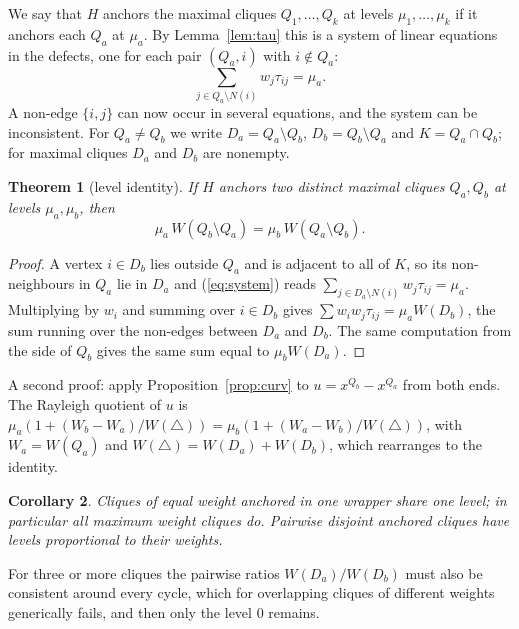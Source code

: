 \documentclass[11pt]{article}
\newtheorem{thm}{Theorem}[section]
\newtheorem{cor}[thm]{Corollary}
\theoremstyle{definition}
\theoremstyle{remark}
\begin{document}
We say that $H$ anchors the maximal cliques $Q_1,\ldots,Q_k$ at levels
$\mu_1,\ldots,\mu_k$ if it anchors each $Q_a$ at $\mu_a$. By
Lemma~\ref{lem:tau} this is a system of linear equations in the defects,
one for each pair $(Q_a,i)$ with $i\notin Q_a$:
\begin{equation}
\label{eq:system}
\sum_{j\in Q_a\setminus N(i)} w_j\tau_{ij}=\mu_a .
\end{equation}
A non-edge $\{i,j\}$ can now occur in several equations, and the system can
be inconsistent. For $Q_a\neq Q_b$ we write $D_a=Q_a\setminus Q_b$,
$D_b=Q_b\setminus Q_a$ and $K=Q_a\cap Q_b$; for maximal cliques $D_a$ and
$D_b$ are nonempty.

\begin{thm}[level identity]
\label{thm:level}
If $H$ anchors two distinct maximal cliques $Q_a,Q_b$ at levels
$\mu_a,\mu_b$, then
\[ \mu_a\,W(Q_b\setminus Q_a) = \mu_b\,W(Q_a\setminus Q_b). \]
\end{thm}
\begin{proof}
A vertex $i\in D_b$ lies outside $Q_a$ and is adjacent to all of $K$, so
its non-neighbours in $Q_a$ lie in $D_a$ and (\ref{eq:system}) reads
$\sum_{j\in D_a\setminus N(i)}w_j\tau_{ij}=\mu_a$. Multiplying by $w_i$ and
summing over $i\in D_b$ gives
$\sum w_iw_j\tau_{ij}=\mu_aW(D_b)$, the sum running over the non-edges
between $D_a$ and $D_b$. The same computation from the side of $Q_b$ gives
the same sum equal to $\mu_bW(D_a)$.
\end{proof}

A second proof: apply Proposition~\ref{prop:curv} to $u=x^{Q_b}-x^{Q_a}$
from both ends. The Rayleigh quotient of $u$ is
$\mu_a(1+(W_b-W_a)/W(\triangle))=\mu_b(1+(W_a-W_b)/W(\triangle))$, with
$W_a=W(Q_a)$ and $W(\triangle)=W(D_a)+W(D_b)$, which rearranges to the
identity.

\begin{cor}
\label{cor:equal}
Cliques of equal weight anchored in one wrapper share one level; in
particular all maximum weight cliques do. Pairwise disjoint anchored cliques
have levels proportional to their weights.
\end{cor}

For three or more cliques the pairwise ratios
$W(D_a)/W(D_b)$ must also be consistent around every cycle, which for
overlapping cliques of different weights generically fails, and then only
the level $0$ remains.
\end{document}
